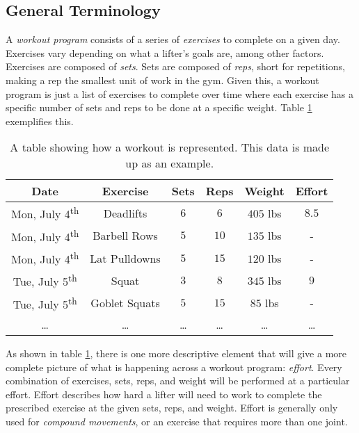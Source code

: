 \subsection{General Terminology}
\label{sec:P1_GeneralTerminology}

A \textit{workout program} consists of a series of \textit{exercises} to complete on a given day. Exercises vary depending on what a lifter's goals are, among other factors. Exercises are composed of \textit{sets}. Sets are composed of \textit{reps}, short for repetitions, making a rep the smallest unit of work in the gym. Given this, a workout program is just a list of exercises to complete over time where each exercise has a specific number of sets and reps to be done at a specific weight. Table \ref{tab:P1_WorkoutProgramExample} exemplifies this.

\begin{table}[h]
    \centering
    \begin{tabular}{c|c|c|c|c|c}
        Date & Exercise & Sets & Reps & Weight & Effort \\
        \hline
        Mon, July 4\textsuperscript{th} & Deadlifts & $6$ & $6$ & $405$ lbs & $8.5$ \\
        Mon, July 4\textsuperscript{th} & Barbell Rows & $5$ & $10$ & $135$ lbs & - \\
        Mon, July 4\textsuperscript{th} & Lat Pulldowns & $5$ & $15$ & $120$ lbs & - \\
        Tue, July 5\textsuperscript{th} & Squat & $3$ & $8$ & $345$ lbs & $9$ \\
        Tue, July 5\textsuperscript{th} & Goblet Squats & $5$ & $15$ & $85$ lbs & - \\
        \dots & \dots & \dots & \dots & \dots & \dots \\
    \end{tabular}
    \caption{A table showing how a workout is represented. This data is made up as an example.}
    \label{tab:P1_WorkoutProgramExample}
\end{table}

As shown in table \ref{tab:P1_WorkoutProgramExample}, there is one more descriptive element that will give a more complete picture of what is happening across a workout program: \textit{effort}. Every combination of exercises, sets, reps, and weight will be performed at a particular effort. Effort describes how hard a lifter will need to work to complete the prescribed exercise at the given sets, reps, and weight. Effort is generally only used for \textit{compound movements}, or an exercise that requires more than one joint.

